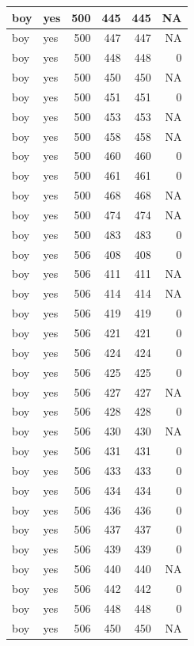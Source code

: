 \documentclass[man]{apa6}
\begin{document}
\begin{tabular}{l|l|r|r|r|r}
\hline
boy & yes & 500 & 445 & 445 & NA\\
\hline
boy & yes & 500 & 447 & 447 & NA\\
\hline
boy & yes & 500 & 448 & 448 & 0\\
\hline
boy & yes & 500 & 450 & 450 & NA\\
\hline
boy & yes & 500 & 451 & 451 & 0\\
\hline
boy & yes & 500 & 453 & 453 & NA\\
\hline
boy & yes & 500 & 458 & 458 & NA\\
\hline
boy & yes & 500 & 460 & 460 & 0\\
\hline
boy & yes & 500 & 461 & 461 & 0\\
\hline
boy & yes & 500 & 468 & 468 & NA\\
\hline
boy & yes & 500 & 474 & 474 & NA\\
\hline
boy & yes & 500 & 483 & 483 & 0\\
\hline
boy & yes & 506 & 408 & 408 & 0\\
\hline
boy & yes & 506 & 411 & 411 & NA\\
\hline
boy & yes & 506 & 414 & 414 & NA\\
\hline
boy & yes & 506 & 419 & 419 & 0\\
\hline
boy & yes & 506 & 421 & 421 & 0\\
\hline
boy & yes & 506 & 424 & 424 & 0\\
\hline
boy & yes & 506 & 425 & 425 & 0\\
\hline
boy & yes & 506 & 427 & 427 & NA\\
\hline
boy & yes & 506 & 428 & 428 & 0\\
\hline
boy & yes & 506 & 430 & 430 & NA\\
\hline
boy & yes & 506 & 431 & 431 & 0\\
\hline
boy & yes & 506 & 433 & 433 & 0\\
\hline
boy & yes & 506 & 434 & 434 & 0\\
\hline
boy & yes & 506 & 436 & 436 & 0\\
\hline
boy & yes & 506 & 437 & 437 & 0\\
\hline
boy & yes & 506 & 439 & 439 & 0\\
\hline
boy & yes & 506 & 440 & 440 & NA\\
\hline
boy & yes & 506 & 442 & 442 & 0\\
\hline
boy & yes & 506 & 448 & 448 & 0\\
\hline
boy & yes & 506 & 450 & 450 & NA\\

\end{tabular}
\end{document}
